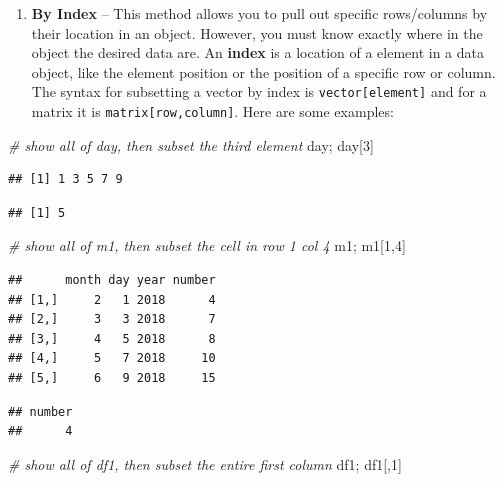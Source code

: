 \documentclass[]{book}
\newenvironment{Shaded}{\begin{snugshade}}{\end{snugshade}}
\newcommand{\DecValTok}[1]{\textcolor[rgb]{0.00,0.00,0.81}{#1}}
\newcommand{\CommentTok}[1]{\textcolor[rgb]{0.56,0.35,0.01}{\textit{#1}}}
\newcommand{\NormalTok}[1]{#1}
\providecommand{\tightlist}{%
  \setlength{\itemsep}{0pt}\setlength{\parskip}{0pt}}
\theoremstyle{definition}
\theoremstyle{definition}
\theoremstyle{definition}
\theoremstyle{remark}
\begin{document}
\begin{enumerate}
\def\labelenumi{\arabic{enumi}.}
\tightlist
\item
  \textbf{By Index} -- This method allows you to pull out specific
  rows/columns by their location in an object. However, you must know
  exactly where in the object the desired data are. An \textbf{index} is
  a location of a element in a data object, like the element position or
  the position of a specific row or column. The syntax for subsetting a
  vector by index is \texttt{vector{[}element{]}} and for a matrix it is
  \texttt{matrix{[}row,column{]}}. Here are some examples:
\end{enumerate}

\begin{Shaded}
\begin{Highlighting}[]
\CommentTok{# show all of day, then subset the third element}
\NormalTok{day; day[}\DecValTok{3}\NormalTok{]}
\end{Highlighting}
\end{Shaded}

\begin{verbatim}
## [1] 1 3 5 7 9
\end{verbatim}

\begin{verbatim}
## [1] 5
\end{verbatim}

\begin{Shaded}
\begin{Highlighting}[]
\CommentTok{# show all of m1, then subset the cell in row 1 col 4 }
\NormalTok{m1; m1[}\DecValTok{1}\NormalTok{,}\DecValTok{4}\NormalTok{]}
\end{Highlighting}
\end{Shaded}

\begin{verbatim}
##      month day year number
## [1,]     2   1 2018      4
## [2,]     3   3 2018      7
## [3,]     4   5 2018      8
## [4,]     5   7 2018     10
## [5,]     6   9 2018     15
\end{verbatim}

\begin{verbatim}
## number 
##      4
\end{verbatim}

\begin{Shaded}
\begin{Highlighting}[]
\CommentTok{# show all of df1, then subset the entire first column}
\NormalTok{df1; df1[,}\DecValTok{1}\NormalTok{]}
\end{Highlighting}
\end{Shaded}
\end{document}
